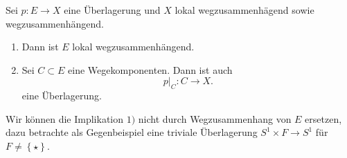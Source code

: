 \begin{theorem}\label{thm:überlagerung-über-lokal-wegzusammenhängendem-raum-zerfällt-in-wegzusammenhängende-komponenten-von-e}
    Sei $p\colon E\to X$ eine Überlagerung und $X$ lokal wegzusammenhägend sowie wegzusammenhängend.
    \begin{enumerate}[1)]
        \item Dann ist $E$ lokal wegzusammenhängend. 
        \item Sei $C\subset E$ eine Wegekomponenten. Dann ist auch
            \[
            p|_C \colon  C \to X
            .\] 
            eine Überlagerung.
    \end{enumerate}
\end{theorem}

\begin{oral}
    Wir können die Implikation $1)$ nicht durch Wegzusammenhang von $E$ ersetzen, dazu betrachte als Gegenbeispiel eine triviale Überlagerung $S^1 \times F \to  S^1$ für $F\neq \left \{\star\right\} $.
\end{oral}

